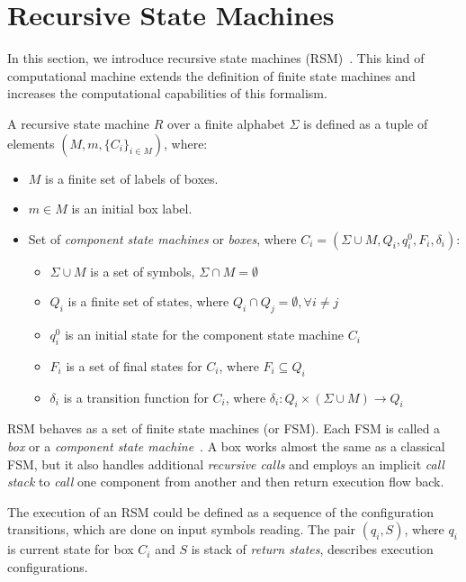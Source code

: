 \section{Recursive State Machines}
\label{section:rsm}

In this section, we introduce recursive state machines (RSM)~\cite{rsm:analysis:10.1007/3-540-44585-4_18}.
This kind of computational machine extends the definition of finite state machines and increases the computational capabilities of this formalism.

A recursive state machine $R$ over a finite alphabet $\Sigma$ is defined as a tuple of elements $(M,m,\{C_i\}_{i \in M})$, where:

\begin{itemize}
    \item $M$ is a finite set of labels of boxes.
    \item $m \in M$ is an initial box label.
    \item Set of \textit{component state machines} or \textit{boxes},
          where $C_i=(\Sigma \cup M, Q_i,q_i^0,F_i,\delta_i)$:
    \begin{itemize}
        \item $\Sigma \cup M$ is a set of symbols, $\Sigma \cap M = \emptyset$
        \item $Q_i$ is a finite set of states,
              where $Q_i \cap Q_j = \emptyset, \forall i \neq j$
        \item $q_i^0$ is an initial state for the component state machine $C_i$
        \item $F_i$ is a set of final states for $C_i$, where $F_i \subseteq Q_i$
        \item $\delta_i$ is a transition function for $C_i$,
              where $\delta_i: Q_i \times (\Sigma \cup M)
              \to Q_i$
    \end{itemize}
\end{itemize}

RSM behaves as a set of finite state machines (or FSM).
Each FSM is called a \textit{box} or a \textit{component state machine}~\cite{rsm:analysis:10.1007/3-540-44585-4_18}.
A box works almost the same as a classical FSM, but it also handles additional \textit{recursive calls} and employs an implicit \textit{call stack} to \textit{call} one component from another and then return execution flow back.

The execution of an RSM could be defined as a sequence of the configuration transitions, which are done on input symbols reading. 
The pair $(q_i,S)$, where $q_i$ is current state for box $C_i$ and $S$ is stack of \textit{return states}, describes execution configurations. 

